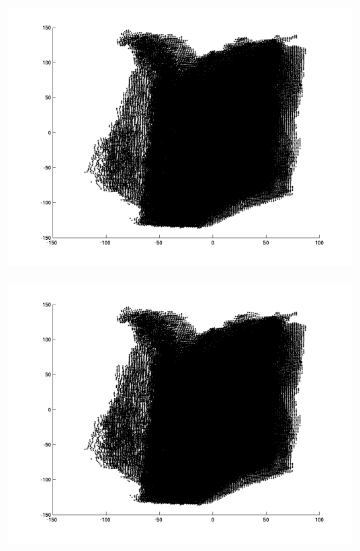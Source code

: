 \begin{figure}[H]
	\begin{subfigure}[b]{0.3\textwidth}
		\centering
		\includegraphics[width=\textwidth]{Images/Book13.png}
		\caption{}
	\end{subfigure}%
	\begin{subfigure}[b]{0.3\textwidth}
		\centering
		\includegraphics[width=\textwidth]{Images/Book14.png}
		\caption{}
	\end{subfigure}
	\begin{subfigure}[b]{0.3\textwidth}
		\centering

\end{subfigure}
\end{figure}
